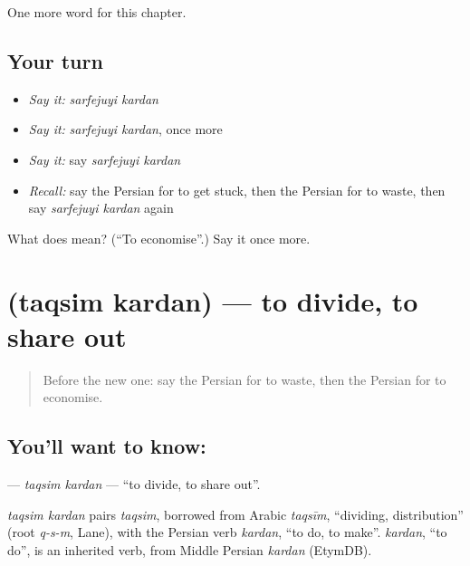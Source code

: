 \begin{grammarlens}[title={What you've built}]
One more word for this chapter.
\end{grammarlens}

\subsection*{Your turn}
\begin{itemize}
\raggedright
  \item \emph{Say it:} \emph{sarfejuyi kardan}
  \item \emph{Say it:} \emph{sarfejuyi kardan}, once more
  \item \emph{Say it:} say \emph{sarfejuyi kardan}
  \item \emph{Recall:} say the Persian for to get stuck, then the Persian for to waste, then say \emph{sarfejuyi kardan} again
\end{itemize}

\begin{tcolorbox}[breakable,colback=teal!4,colframe=teal!35!black,title={Before you move on}]
What does    mean? (\textquotedblleft{}To economise\textquotedblright{}.) Say it once more.
\end{tcolorbox}
\section[\texorpdfstring{\fa{تقسیم} \fa{کردن} (taqsim kardan)}{تقسیم کردن (taqsim kardan)}]{  (taqsim kardan) — to divide, to share out}

\label{lesson:FA-C149-taqsim-kardan}



\begin{quote}
Before the new one: say the Persian for to waste, then the Persian for to economise.
\end{quote}

\subsection*{You'll want to know:  }
\textbf{ } — \emph{taqsim kardan} — \textquotedblleft{}to divide, to share out\textquotedblright{}.

\begin{cousinweb}
\emph{taqsim kardan} pairs \emph{taqsim}, borrowed from Arabic \emph{taqsīm}, \textquotedblleft{}dividing, distribution\textquotedblright{} (root \emph{q-s-m}, Lane), with the Persian verb \emph{kardan}, \textquotedblleft{}to do, to make\textquotedblright{}. \emph{kardan}, \textquotedblleft{}to do\textquotedblright{}, is an inherited verb, from Middle Persian \emph{kardan} (EtymDB).
\end{cousinweb}

